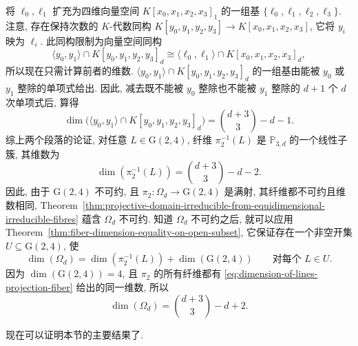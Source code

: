 \begin{Proof}
将 $\ell_{0},\ell_{1}$ 扩充为四维向量空间 $K[x_{0},x_{1},x_{2},x_{3}]_{1}$ 的一组基 $\{\ell_{0},\ell_{1},\ell_{2},\ell_{3}\}$. 注意, 存在保持次数的 $K$-代数同构 $K[y_{0},y_{1},y_{2},y_{3}]\to K[x_{0},x_{1},x_{2},x_{3}]$, 它将 $y_{i}$ 映为 $\ell_{i}$. 此同构限制为向量空间同构
\[
  \langle y_{0},y_{1}\rangle\cap K[y_{0},y_{1},y_{2},y_{3}]_{d}
  \cong\langle\ell_{0},\ell_{1}\rangle\cap K[x_{0},x_{1},x_{2},x_{3}]_{d},
\]
所以现在只需计算前者的维数. $\langle y_{0},y_{1}\rangle\cap K[y_{0},y_{1},y_{2},y_{3}]_{d}$ 的一组基由能被 $y_{0}$ 或 $y_{1}$ 整除的单项式给出. 因此, 减去既不能被 $y_{0}$ 整除也不能被 $y_{1}$ 整除的 $d+1$ 个 $d$ 次单项式后, 算得
\[
  \dim\bigl(\langle y_{0},y_{1}\rangle\cap K[y_{0},y_{1},y_{2},y_{3}]_{d}\bigr)
  =\binom{d+3}{3}-d-1.
\]
综上两个段落的论证, 对任意 $L\in\mathrm{G}(2,4)$, 纤维 $\pi_{2}^{-1}(L)$ 是 $\mathbb{P}_{3,d}$ 的一个线性子簇, 其维数为
\begin{equation}\label{eq:dimension-of-lines-projection-fiber}
  \dim(\pi_{2}^{-1}(L))=\binom{d+3}{3}-d-2.
\end{equation}
因此, 由于 $\mathrm{G}(2,4)$ 不可约, 且 $\pi_{2}:\Omega_{d}\to\mathrm{G}(2,4)$ 是满射, 其纤维都不可约且维数相同, Theorem~\ref{thm:projective-domain-irreducible-from-equidimensional-irreducible-fibres} 蕴含 $\Omega_{d}$ 不可约. 知道 $\Omega_{d}$ 不可约之后, 就可以应用 Theorem~\ref{thm:fiber-dimension-equality-on-open-subset}, 它保证存在一个非空开集 $U\subseteq\mathrm{G}(2,4)$, 使
\[
  \dim(\Omega_{d})=\dim(\pi_{2}^{-1}(L))+\dim(\mathrm{G}(2,4))
  \qquad\text{对每个 }L\in U.
\]
因为 $\dim(\mathrm{G}(2,4))=4$, 且 $\pi_{2}$ 的所有纤维都有 \eqref{eq:dimension-of-lines-projection-fiber} 给出的同一维数, 所以
\[
  \dim(\Omega_{d})=\binom{d+3}{3}-d+2.
\]
\end{Proof}

现在可以证明本节的主要结果了.

